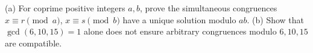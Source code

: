 (a) For coprime positive integers $a,b$, prove the simultaneous congruences $x\equiv r\pmod a$, $x\equiv s\pmod b$ have a unique solution modulo $ab$. (b) Show that $\gcd(6,10,15)=1$ alone does not ensure arbitrary congruences modulo $6,10,15$ are compatible.
